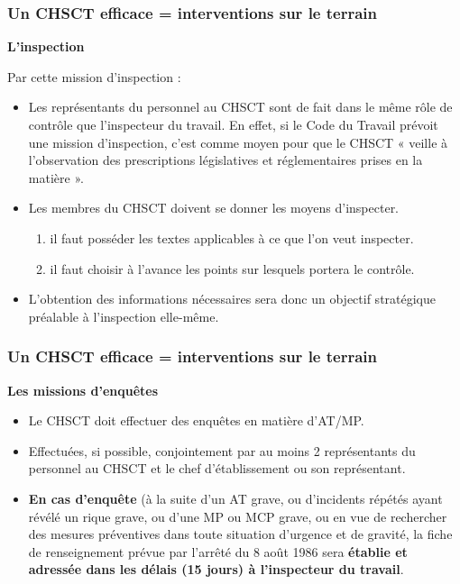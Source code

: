 \documentclass{beamer}
\begin{document}
\begin{frame}
\frametitle{Un CHSCT efficace = interventions sur le terrain}

\textbf{L’inspection}

Par cette mission d’inspection :
\begin{itemize}
\item Les représentants du personnel au CHSCT sont de fait dans le même rôle de contrôle que l’inspecteur du travail. En effet, si le Code du Travail prévoit une mission d’inspection, c’est comme moyen pour que le CHSCT « veille à l’observation des prescriptions législatives et réglementaires prises en la matière ».

\item Les membres du CHSCT doivent se donner les moyens d’inspecter.
\begin{enumerate}
\item il faut posséder les textes applicables à ce que l’on veut inspecter.
\item il faut choisir à l’avance les points sur lesquels portera le contrôle.
\end{enumerate}
\item L’obtention des informations nécessaires sera donc un objectif stratégique préalable à l’inspection elle-même.
\end{itemize}
\end{frame}

\begin{frame}
\frametitle{Un CHSCT efficace = interventions sur le terrain}

\textbf{Les missions d’enquêtes}

\begin{itemize}
\item Le CHSCT doit effectuer des enquêtes en matière d'AT/MP.

\item Effectuées, si possible, conjointement par au moins 2 représentants du personnel au CHSCT et le chef d'établissement ou son représentant.

\item \textbf{En cas d'enquête} (à la suite d'un AT grave, ou d'incidents répétés ayant révélé un rique grave, ou d'une MP ou MCP grave, ou en vue de rechercher des mesures préventives dans toute situation d'urgence et de gravité, la fiche de renseignement prévue par l'arrêté du 8 août 1986 sera \textbf{établie et adressée dans les délais (15 jours) à l'inspecteur du travail}.
\end{itemize}
\end{frame}
\end{document}
